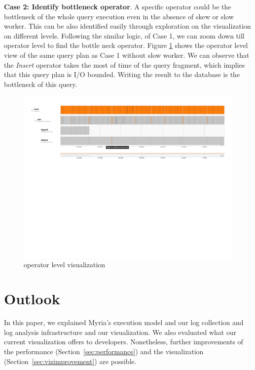 \documentclass[11pt]{scrartcl}
\begin{document}
\noindent \textbf{Case 2: Identify bottleneck operator}.
A specific operator could be the bottleneck of the whole query execution even in the absence of skew or slow worker. This can be also identified easily through exploration on the visualization on different levels. Following the similar logic, of Case 1, we can zoom down till operator level to find the bottle neck operator. Figure \ref{fig:bottleneck_operator} shows the operator level view of the same query plan as Case 1 without slow worker. We can observe that the \emph{Insert} operator takes the most of time of the query fragment, which implies that this query plan is I/O bounded. Writing the result to the database is the bottleneck of this query.

\begin{figure}[h]
  \begin{center}
	\includegraphics[width=\textwidth]{bottleneck_operator.pdf}
  \end{center}
 \caption{operator level visualization}
  \label{fig:bottleneck_operator}
 \end{figure}



\section{Outlook}
\label{sec:outlook}

In this paper, we explained Myria's execution model and our log collection and log analysis infrastructure and our visualization. We also evaluated what our current visualization offers to developers. Nonetheless, further improvements of the performance (Section~\ref{sec:performance}) and the visualization (Section~\ref{sec:vizimprovement}) are possible.
\end{document}
